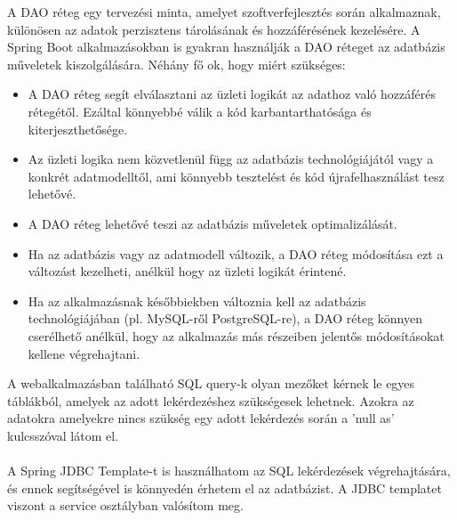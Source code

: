 
A DAO réteg egy tervezési minta, amelyet szoftverfejlesztés során alkalmaznak, különösen az adatok perzisztens tárolásának és hozzáférésének kezelésére. A Spring Boot alkalmazásokban is gyakran használják a DAO réteget az adatbázis műveletek kiszolgálására. Néhány fő ok, hogy miért szükséges:

\begin{itemize}

\item{} A DAO réteg segít elválasztani az üzleti logikát az adathoz való hozzáférés rétegétől. Ezáltal könnyebbé válik a kód karbantarthatósága és kiterjeszthetősége. 

\item{} Az üzleti logika nem közvetlenül függ az adatbázis technológiájától vagy a konkrét adatmodelltől, ami könnyebb tesztelést és kód újrafelhasználást tesz lehetővé. 

\item{} A DAO réteg lehetővé teszi az adatbázis műveletek optimalizálását. 

\item{} Ha az adatbázis vagy az adatmodell változik, a DAO réteg módosítása ezt a változást kezelheti, anélkül hogy az üzleti logikát érintené. 

\item{} Ha az alkalmazásnak későbbiekben változnia kell az adatbázis technológiájában (pl. MySQL-ről PostgreSQL-re), a DAO réteg könnyen cserélhető anélkül, hogy az alkalmazás más részeiben jelentős módosításokat kellene végrehajtani.

\end{itemize}

A webalkalmazásban található SQL query-k olyan mezőket kérnek le egyes táblákból, amelyek az adott lekérdezéshez szükségesek lehetnek. Azokra az adatokra amelyekre nincs szükség egy adott lekérdezés során a 'null as' kulcsszóval látom el.\\
\\
A Spring JDBC Template-t is használhatom az SQL lekérdezések végrehajtására, és ennek segítségével is könnyedén érhetem el az adatbázist. A JDBC templatet viszont a service osztályban valósítom meg.




